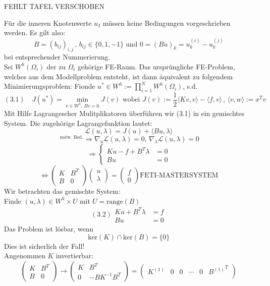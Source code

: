 \begin{enumerate}
FEHLT TAFEL VERSCHOBEN


Für die inneren Knotenwerte $u_I$ müssen keine Bedingungen vorgeschrieben werden. Es gilt also:
\[ B=(b_{ij})_{i,j}\, , \, b_{ij}\in \{ 0,1,-1 \} \text{ und } 0 = (Bu)_k=u^{(i)}_k - u^{(j)}_k \]
bei entsprechender Nummerierung.\\
Sei $W^h(\Omega_i)$ der zu $\Omega_i$ gehörige FE-Raum. Das ursprüngliche FE-Problem, welches aus dem Modellproblem entsteht, ist dann äquivalent zu folgendem Minimierungsproblem:
Fionde $u^* \in W^h := \prod_{i=1}^N W^h (\Omega_i)$, s.d.
\[(3.1) \quad J(u^*) = \min_{v \in W^h, \, Bv=0} J(v) \text{ wobei } J(v):=\frac{1}{2} \langle Kv,v\rangle - \langle f,v \rangle\, , \, \langle v , w \rangle := x^Tv \]
Mit Hilfe Lagrangescher Mulitplikatoren überführen wir (3.1) in ein gemischtes System. Die zugehörige Lagrangefunktion lautet:
\[ \mathcal{L}(u,\lambda)=J(u)+\langle Bu,\lambda \rangle \]
\[^{\text{ notw. Bed.}}\Rightarrow \nabla_u \mathcal{L} (u,\lambda)=0,\, \nabla_\lambda \mathcal{L} (u,\lambda)=0  \]
\[\Rightarrow \begin{cases} Ku-f+B^T\lambda &=0 \\ Bu &= 0 \end{cases} \]
\[ \Leftrightarrow \begin{pmatrix} K & B^T \\ B & 0 \end{pmatrix} \begin{pmatrix}u \\ \lambda \end{pmatrix} = \begin{pmatrix} f \\ 0 \end{pmatrix}  \boxed{\text{FETI-MASTERSYSTEM}} \]
Wir betrachten das gemischte System:\\
Finde $(u,\lambda) \in W^h \times U $ mit $U=\text{range}(B)$
\begin{equation}
(3.2) \begin{aligned}Ku+B^T\lambda &= f \\ Bu &= 0 \end{aligned}
\end{equation}
Das Problem ist lösbar, wenn
\[ \text{ker}(K)\cap \text{ker}(B) = \{ 0 \} \]
Dies ist sicherlich der Fall!\\
Angenommen $K$ invertierbar:
\[ \begin{pmatrix} K & B^T \\ B & 0 \end{pmatrix} \rightarrow  \begin{pmatrix} K & B^T \\ 0 & -BK^{-1}B^T \end{pmatrix} = \begin{pmatrix}   K^{(1)} & 0 & 0 & \cdots & 0 & {B^{(1)}}^T \\

\end{pmatrix}\]
\end{enumerate}
